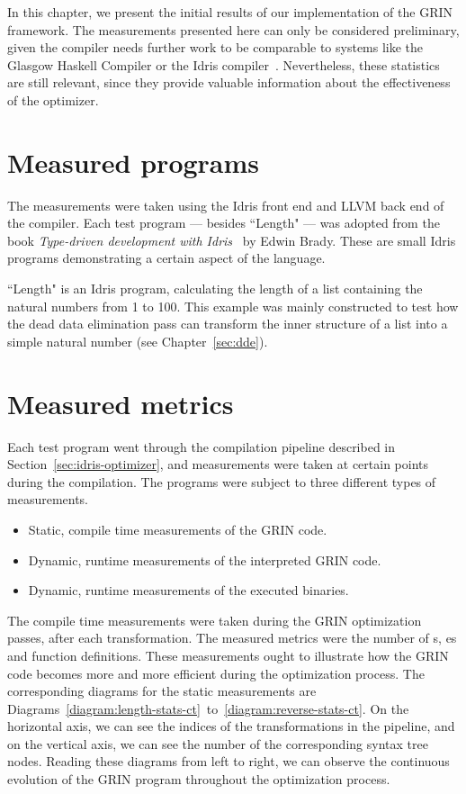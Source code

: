 \documentclass[main.tex]{subfiles}
\begin{document}
	
	In this chapter, we present the initial results of our implementation of the GRIN framework. The measurements presented here can only be considered preliminary, given the compiler needs further work to be comparable to systems like the Glasgow Haskell Compiler or the Idris compiler~\cite{idris}. Nevertheless, these statistics are still relevant, since they provide valuable information about the effectiveness of the optimizer.
	
	\section{Measured programs}
	
	The measurements were taken using the Idris front end and LLVM back end of the compiler. Each test program --- besides ``Length" --- was adopted from the book \textit{Type-driven development with Idris}~\cite{tdd-idris} by Edwin Brady. These are small Idris programs demonstrating a certain aspect of the language.
	
	``Length" is an Idris program, calculating the length of a list containing the natural numbers from 1 to 100. This example was mainly constructed to test how the dead data elimination pass can transform the inner structure of a list into a simple natural number (see Chapter~\ref{sec:dde}).
	
	\section{Measured metrics}
	
	Each test program went through the compilation pipeline described in Section~\ref{sec:idris-optimizer}, and measurements were taken at certain points during the compilation. The programs were subject to three different types of measurements.
	
	\vspace{0.25cm}
	\begin{itemize}
		\item Static, compile time measurements of the GRIN code.
		\item Dynamic, runtime measurements of the interpreted GRIN code.
		\item Dynamic, runtime measurements of the executed binaries.
	\end{itemize}
	\vspace{0.25cm}

	The compile time measurements were taken during the GRIN optimization passes, after each transformation. The measured metrics were the number of s, es and function definitions. These measurements ought to illustrate how the GRIN code becomes more and more efficient during the optimization process. The corresponding diagrams for the static measurements are Diagrams~\ref{diagram:length-stats-ct}~to~\ref{diagram:reverse-stats-ct}. On the horizontal axis, we can see the indices of the transformations in the pipeline, and on the vertical axis, we can see the number of the corresponding syntax tree nodes. Reading these diagrams from left to right, we can observe the continuous evolution of the GRIN program throughout the optimization process.
	
\end{document}
